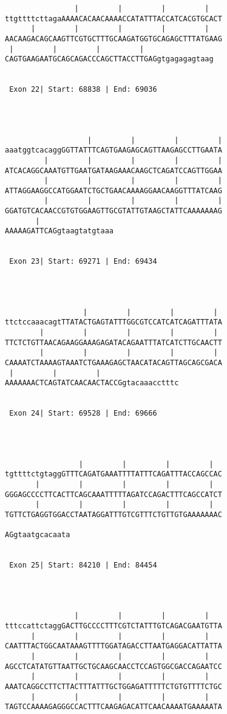 \documentclass{article}
\begin{document}
\begin{Verbatim}
                |         |         |         |   
ttgttttcttagaAAAACACAACAAAACCATATTTACCATCACGTGCACT
      |         |         |         |         |   
AACAAGACAGCAAGTTCGTGCTTTGCAAGATGGTGCAGAGCTTTATGAAG
 |         |         |         |   
CAGTGAAGAATGCAGCAGACCCAGCTTACCTTGAGgtgagagagtaag


 Exon 22| Start: 68838 | End: 69036 




                   |         |         |         |
aaatggtcacaggGGTTATTTCAGTGAAGAGCAGTTAAGAGCCTTGAATA
         |         |         |         |         |
ATCACAGGCAAATGTTGAATGATAAGAAACAAGCTCAGATCCAGTTGGAA
         |         |         |         |         |
ATTAGGAAGGCCATGGAATCTGCTGAACAAAAGGAACAAGGTTTATCAAG
         |         |         |         |         |
GGATGTCACAACCGTGTGGAAGTTGCGTATTGTAAGCTATTCAAAAAAAG
       |    
AAAAAGATTCAGgtaagtatgtaaa


 Exon 23| Start: 69271 | End: 69434 




                  |         |         |         | 
ttctccaaacagtTTATACTGAGTATTTGGCGTCCATCATCAGATTTATA
        |         |         |         |         | 
TTCTCTGTTAACAGAAGGAAAGAGATACAGAATTTATCATCTTGCAACTT
        |         |         |         |         | 
CAAAATCTAAAAGTAAATCTGAAAGAGCTAACATACAGTTAGCAGCGACA
 |         |         |     
AAAAAAACTCAGTATCAACAACTACCGgtacaaacctttc


 Exon 24| Start: 69528 | End: 69666 




                 |         |         |         |  
tgttttctgtaggGTTTCAGATGAAATTTTATTTCAGATTTACCAGCCAC
       |         |         |         |         |  
GGGAGCCCCTTCACTTCAGCAAATTTTTAGATCCAGACTTTCAGCCATCT
       |         |         |         |         |  
TGTTCTGAGGTGGACCTAATAGGATTTGTCGTTTCTGTTGTGAAAAAAAC
  
AGgtaatgcacaata


 Exon 25| Start: 84210 | End: 84454 




                |         |         |         |   
tttccattctaggGACTTGCCCCTTTCGTCTATTTGTCAGACGAATGTTA
      |         |         |         |         |   
CAATTTACTGGCAATAAAGTTTTGGATAGACCTTAATGAGGACATTATTA
      |         |         |         |         |   
AGCCTCATATGTTAATTGCTGCAAGCAACCTCCAGTGGCGACCAGAATCC
      |         |         |         |         |   
AAATCAGGCCTTCTTACTTTATTTGCTGGAGATTTTTCTGTGTTTTCTGC
      |         |         |         |         |   
TAGTCCAAAAGAGGGCCACTTTCAAGAGACATTCAACAAAATGAAAAATA
        

\end{Verbatim}
\end{document}

